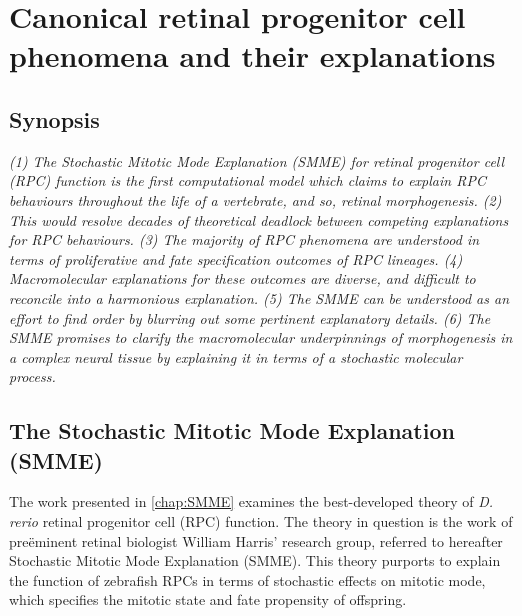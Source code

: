 \chapter{Canonical retinal progenitor cell phenomena and their explanations}
\label{chap:RPCreview}

\section*{Synopsis}
\textit{(1) The Stochastic Mitotic Mode Explanation (SMME) for retinal progenitor cell (RPC) function is the first computational model which claims to explain RPC behaviours throughout the life of a vertebrate, and so, retinal morphogenesis. (2) This would resolve decades of theoretical deadlock between competing explanations for RPC behaviours. (3) The majority of RPC phenomena are understood in terms of proliferative and fate specification outcomes of RPC lineages. (4) Macromolecular explanations for these outcomes are diverse, and difficult to reconcile into a harmonious explanation. (5) The SMME can be understood as an effort to find order by blurring out some pertinent explanatory details. (6) The SMME promises to clarify the macromolecular underpinnings of morphogenesis in a complex neural tissue by explaining it in terms of a stochastic molecular process.}

\section{The Stochastic Mitotic Mode Explanation (SMME)}
The work presented in \autoref{chap:SMME} examines the best-developed theory of \textit{D. rerio} retinal progenitor cell (RPC) function. The theory in question is the work of pre\"{e}minent retinal biologist William Harris' research group, referred to hereafter Stochastic Mitotic Mode Explanation (SMME). This theory purports to explain the function of zebrafish RPCs in terms of stochastic effects on mitotic mode, which specifies the mitotic state and fate propensity of offspring.

